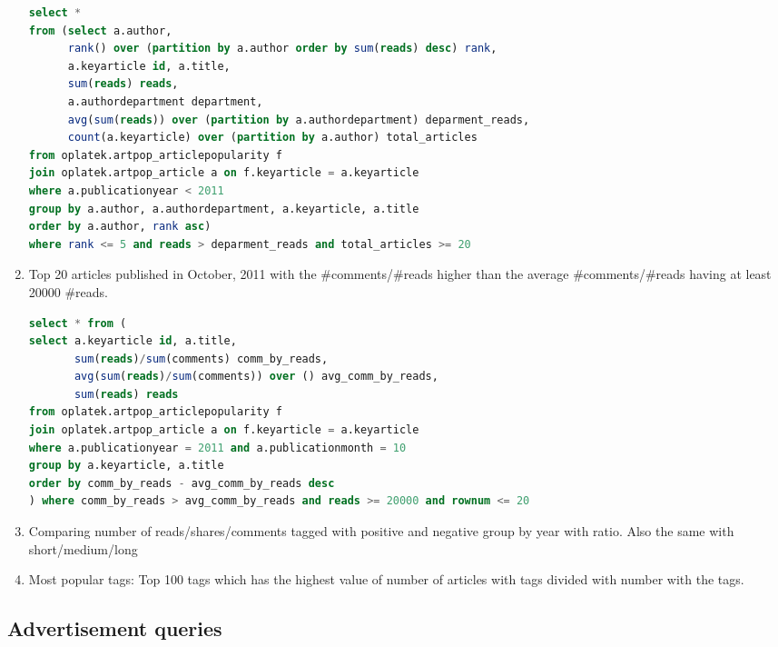 \begin{enumerate}
\begin{lstlisting}[language=sql] 
select *
from (select a.author, 
      rank() over (partition by a.author order by sum(reads) desc) rank,
      a.keyarticle id, a.title,
      sum(reads) reads, 
      a.authordepartment department,
      avg(sum(reads)) over (partition by a.authordepartment) deparment_reads,
      count(a.keyarticle) over (partition by a.author) total_articles
from oplatek.artpop_articlepopularity f
join oplatek.artpop_article a on f.keyarticle = a.keyarticle
where a.publicationyear < 2011
group by a.author, a.authordepartment, a.keyarticle, a.title
order by a.author, rank asc)
where rank <= 5 and reads > deparment_reads and total_articles >= 20
\end{lstlisting}
\item    Top 20 articles published in October, 2011 with the \#comments/\#reads higher than the average \#comments/\#reads having at least 20000 \#reads.
\begin{lstlisting}[language=sql] 
select * from (
select a.keyarticle id, a.title,
       sum(reads)/sum(comments) comm_by_reads,
       avg(sum(reads)/sum(comments)) over () avg_comm_by_reads,
       sum(reads) reads
from oplatek.artpop_articlepopularity f
join oplatek.artpop_article a on f.keyarticle = a.keyarticle
where a.publicationyear = 2011 and a.publicationmonth = 10
group by a.keyarticle, a.title
order by comm_by_reads - avg_comm_by_reads desc
) where comm_by_reads > avg_comm_by_reads and reads >= 20000 and rownum <= 20
\end{lstlisting}
\item    Comparing number of reads/shares/comments tagged with positive and negative group by year with ratio. Also the same with short/medium/long
\item    Most popular tags:  Top 100 tags which has the highest value of number of articles with tags divided with number with the tags.
\end{enumerate}

\subsection*{Advertisement  queries} %
\label{sub:Advertisement queries}

